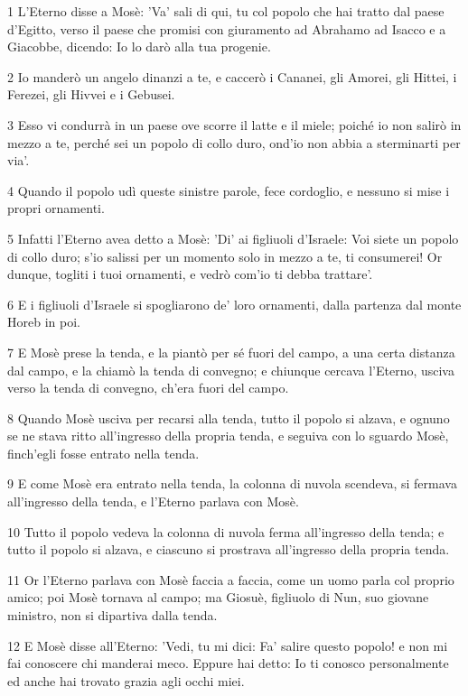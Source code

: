 \par 1 L'Eterno disse a Mosè: 'Va' sali di qui, tu col popolo che hai tratto dal paese d'Egitto, verso il paese che promisi con giuramento ad Abrahamo ad Isacco e a Giacobbe, dicendo: Io lo darò alla tua progenie.
\par 2 Io manderò un angelo dinanzi a te, e caccerò i Cananei, gli Amorei, gli Hittei, i Ferezei, gli Hivvei e i Gebusei.
\par 3 Esso vi condurrà in un paese ove scorre il latte e il miele; poiché io non salirò in mezzo a te, perché sei un popolo di collo duro, ond'io non abbia a sterminarti per via'.
\par 4 Quando il popolo udì queste sinistre parole, fece cordoglio, e nessuno si mise i propri ornamenti.
\par 5 Infatti l'Eterno avea detto a Mosè: 'Di' ai figliuoli d'Israele: Voi siete un popolo di collo duro; s'io salissi per un momento solo in mezzo a te, ti consumerei! Or dunque, togliti i tuoi ornamenti, e vedrò com'io ti debba trattare'.
\par 6 E i figliuoli d'Israele si spogliarono de' loro ornamenti, dalla partenza dal monte Horeb in poi.
\par 7 E Mosè prese la tenda, e la piantò per sé fuori del campo, a una certa distanza dal campo, e la chiamò la tenda di convegno; e chiunque cercava l'Eterno, usciva verso la tenda di convegno, ch'era fuori del campo.
\par 8 Quando Mosè usciva per recarsi alla tenda, tutto il popolo si alzava, e ognuno se ne stava ritto all'ingresso della propria tenda, e seguiva con lo sguardo Mosè, finch'egli fosse entrato nella tenda.
\par 9 E come Mosè era entrato nella tenda, la colonna di nuvola scendeva, si fermava all'ingresso della tenda, e l'Eterno parlava con Mosè.
\par 10 Tutto il popolo vedeva la colonna di nuvola ferma all'ingresso della tenda; e tutto il popolo si alzava, e ciascuno si prostrava all'ingresso della propria tenda.
\par 11 Or l'Eterno parlava con Mosè faccia a faccia, come un uomo parla col proprio amico; poi Mosè tornava al campo; ma Giosuè, figliuolo di Nun, suo giovane ministro, non si dipartiva dalla tenda.
\par 12 E Mosè disse all'Eterno: 'Vedi, tu mi dici: Fa' salire questo popolo! e non mi fai conoscere chi manderai meco. Eppure hai detto: Io ti conosco personalmente ed anche hai trovato grazia agli occhi miei.

